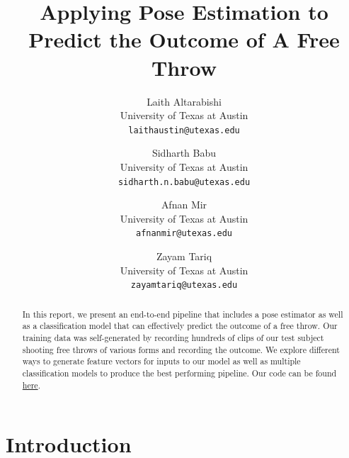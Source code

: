 \documentclass[10pt,twocolumn,letterpaper]{article}
\begin{document}
\title{Applying Pose Estimation to Predict the Outcome of A Free Throw}

\author{Laith Altarabishi\\
University of Texas at Austin\\
{\tt\small laithaustin@utexas.edu}
\and
Sidharth Babu\\
University of Texas at Austin\\
{\tt\small sidharth.n.babu@utexas.edu}
\and
Afnan Mir \\
University of Texas at Austin\\
{\tt\small afnanmir@utexas.edu}
\and
Zayam Tariq \\
University of Texas at Austin\\
{\tt\small zayamtariq@utexas.edu}
}
\maketitle

\begin{abstract}
  In this report, we present an end-to-end pipeline that includes a pose estimator as well as 
  a classification model that can effectively predict the outcome of a free throw. Our training data was
  self-generated by recording hundreds of clips of our test subject shooting free throws of various forms
  and recording the outcome. We explore different ways to generate feature vectors for inputs to our model as 
  well as multiple classification models to produce the best performing pipeline. Our code can be found \href{https://github.com/afnanmmir/Shot-Predictor/}{here}.
\end{abstract}


\section{Introduction}
\label{sec:intro}
\end{document}
